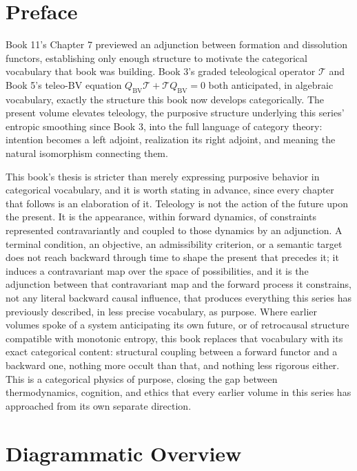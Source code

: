 \chapter*{Preface}

Book 11's Chapter 7 previewed an adjunction between formation and dissolution functors, establishing only enough structure to motivate the categorical vocabulary that book was building. Book 3's graded teleological operator $\mathcal{T}$ and Book 5's teleo-BV equation $Q_{\text{BV}}\mathcal{T} + \mathcal{T} Q_{\text{BV}} = 0$ both anticipated, in algebraic vocabulary, exactly the structure this book now develops categorically. The present volume elevates teleology, the purposive structure underlying this series' entropic smoothing since Book 3, into the full language of category theory: intention becomes a left adjoint, realization its right adjoint, and meaning the natural isomorphism connecting them.

This book's thesis is stricter than merely expressing purposive behavior in categorical vocabulary, and it is worth stating in advance, since every chapter that follows is an elaboration of it. Teleology is not the action of the future upon the present. It is the appearance, within forward dynamics, of constraints represented contravariantly and coupled to those dynamics by an adjunction. A terminal condition, an objective, an admissibility criterion, or a semantic target does not reach backward through time to shape the present that precedes it; it induces a contravariant map over the space of possibilities, and it is the adjunction between that contravariant map and the forward process it constrains, not any literal backward causal influence, that produces everything this series has previously described, in less precise vocabulary, as purpose. Where earlier volumes spoke of a system anticipating its own future, or of retrocausal structure compatible with monotonic entropy, this book replaces that vocabulary with its exact categorical content: structural coupling between a forward functor and a backward one, nothing more occult than that, and nothing less rigorous either. This is a categorical physics of purpose, closing the gap between thermodynamics, cognition, and ethics that every earlier volume in this series has approached from its own separate direction.

\chapter*{Diagrammatic Overview}

